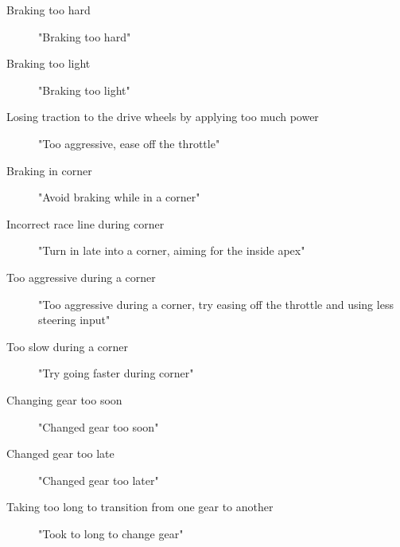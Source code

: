 \begin{description}
	\item [Braking too hard] "Braking too hard"
	\item [Braking too light] "Braking too light"
	\item [Losing traction to the drive wheels by applying too much power] "Too aggressive, ease off the throttle"
	\item [Braking in corner] "Avoid braking while in a corner"
	\item [Incorrect race line during corner] "Turn in late into a corner, aiming for the inside apex"
	\item [Too aggressive during a corner] "Too aggressive during a corner, try easing off the throttle and using less steering input"
	\item [Too slow during a corner] "Try going faster during corner"
	\item [Changing gear too soon] "Changed gear too soon"
	\item [Changed gear too late] "Changed gear too later"
	\item [Taking too long to transition from one gear to another] "Took to long to change gear"
\end{description}